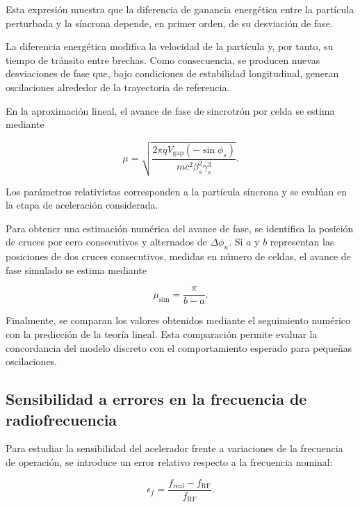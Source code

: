 Esta expresión muestra que la diferencia de ganancia energética entre la partícula perturbada y la síncrona depende, en primer orden, de su desviación de fase.

La diferencia energética modifica la velocidad de la partícula y, por tanto, su tiempo de tránsito entre brechas. Como consecuencia, se producen nuevas desviaciones de fase que, bajo condiciones de estabilidad longitudinal, generan oscilaciones alrededor de la trayectoria de referencia.

En la aproximación lineal, el avance de fase de sincrotrón por celda se estima mediante

\begin{equation}
    \boxed{
    \mu=
    \sqrt{
    \frac{2\pi qV_{\mathrm{gap}}(-\sin\phi_s)}
    {mc^2\beta_s^2\gamma_s^3}
    }
    }.
    \label{eq:mu}
\end{equation}

Los parámetros relativistas corresponden a la partícula síncrona y se evalúan en la etapa de aceleración considerada.

Para obtener una estimación numérica del avance de fase, se identifica la posición de cruces por cero consecutivos y alternados de $\Delta\phi_n$. Si $a$ y $b$ representan las posiciones de dos cruces consecutivos, medidas en número de celdas, el avance de fase simulado se estima mediante

\begin{equation}
    \mu_{\mathrm{sim}}=\frac{\pi}{b-a}.
\end{equation}

Finalmente, se comparan los valores obtenidos mediante el seguimiento numérico con la predicción de la teoría lineal. Esta comparación permite evaluar la concordancia del modelo discreto con el comportamiento esperado para pequeñas oscilaciones.

\subsection{Sensibilidad a errores en la frecuencia de radiofrecuencia}

Para estudiar la sensibilidad del acelerador frente a variaciones de la frecuencia de operación, se introduce un error relativo respecto a la frecuencia nominal:

\begin{equation}
    \epsilon_f=
    \frac{f_{\mathrm{real}}-f_{\mathrm{RF}}}
    {f_{\mathrm{RF}}}.
\end{equation}

